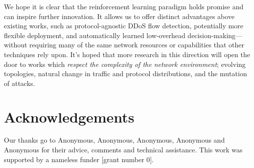 \documentclass[conference, a4paper, 10pt, times]{IEEEtran}
\begin{document}
We hope it is clear that the reinforcement learning paradigm holds promise and can inspire further innovation.
It allows us to offer distinct advantages above existing works, such as protocol-agnostic DDoS flow detection, potentially more flexible deployment, and automatically learned low-overhead decision-making---without requiring many of the same network resources or capabilities that other techniques rely upon.
It's hoped that more research in this direction will open the door to works which \emph{respect the complexity of the network environment}; evolving topologies, natural change in traffic and protocol distributions, and the mutation of attacks.

\section*{Acknowledgements}
Our thanks go to Anonymous, Anonymous, Anonymous, Anonymous and Anonymous for their advice, comments and technical assistance.
This work was supported by a nameless funder [grant number 0].

\renewcommand*{\bibfont}{\small}
\printbibliography
\end{document}
